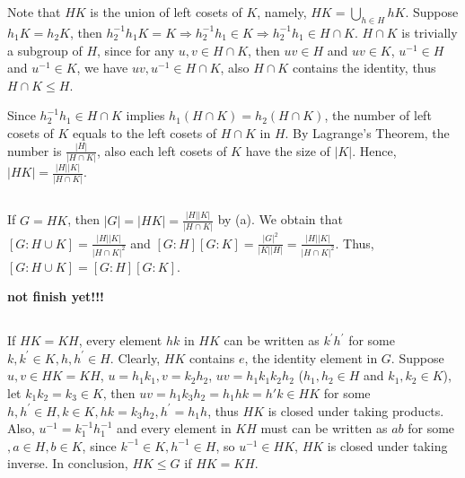 \documentclass[12pt]{article}
\begin{document}
\subsection{}
\subsection{}
\subsection{}

\section{}
\subsection{}
Note that $HK$ is the union of left cosets of $K$, namely, $HK=\bigcup_{h\in H}hK$. Suppose $h_1K=h_2K$, then $h_2^{-1}h_1K=K\Rightarrow h_2^{-1}h_1\in K\Rightarrow h_2^{-1}h_1\in H\cap K$. $H\cap K$ is trivially a subgroup of $H$, since for any $u,v\in H\cap K$, then $uv\in H$ and $uv\in K$, $u^{-1}\in H$ and $u^{-1}\in K$, we have $uv,u^{-1}\in H\cap K$, also $H\cap K$ contains the identity, thus $H\cap K\le H$.

Since $h_2^{-1}h_1\in H\cap K$ implies $h_1(H\cap K)=h_2(H\cap K)$, the number of left cosets of $K$ equals to the left cosets of $H\cap K$ in $H$. By Lagrange's Theorem, the number is $\frac{|H|}{|H\cap K|}$, also each left cosets of $K$ have the size of $|K|$. Hence, $|HK|=\frac{|H||K|}{|H\cap K|}$.
\subsection{}
If $G=HK$, then $|G|=|HK|=\frac{|H||K|}{|H\cap K|}$ by (a). We obtain that $[G:H\cup K]=\frac{|H||K|}{|H\cap K|^2}$ and $[G:H][G:K]=\frac{|G|^2}{|K||H|}=\frac{|H||K|}{|H\cap K|^2}$. Thus, $[G:H\cup K]=[G:H][G:K]$.

\textbf{not finish yet!!!}
\subsection{}
If $HK=KH$, every element $hk$ in $HK$ can be written as $k^{'}h^{'}$ for some $k,k^{'}\in K,h,h^{'}\in H$. Clearly, $HK$ contains $e$, the identity element in $G$. Suppose $u,v\in HK=KH$, $u=h_1k_1, v=k_2h_2$, $uv=h_1k_1k_2h_2$ ($h_1,h_2\in H$ and $k_1,k_2\in K$), let $k_1k_2=k_3\in K$, then $uv=h_1k_3h_2=h_1hk=h'k\in HK$ for some $h,h^{'}\in H, k\in K,hk=k_3h_2, h^{'}=h_1h$, thus $HK$ is closed under taking products. Also, $u^{-1}=k_1^{-1}h_1^{-1}$ and every element in $KH$ must can be written as $ab$ for some $,a\in H,b\in K$, since $k^{-1}\in K,h^{-1}\in H$, so $u^{-1}\in HK$, $HK$ is closed under taking inverse. In conclusion, $HK\le G$ if $HK=KH$.
\end{document}
